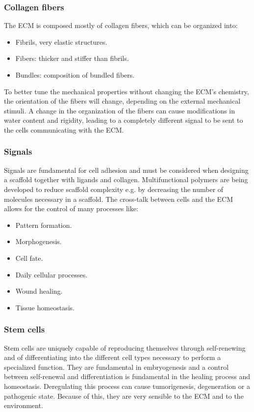 		\subsubsection{Collagen fibers}
		The ECM is composed mostly of collagen fibers, which can be organized into:

		\begin{multicols}{2}
			\begin{itemize}
				\item Fibrils, very elastic structures.
				\item Fibers: thicker and stiffer than fibrils.
				\item Bundles: composition of bundled fibers.
			\end{itemize}
		\end{multicols}

		To better tune the mechanical properties without changing the ECM's chemistry, the orientation of the fibers will change, depending on the external mechanical stimuli.
		A change in the organization of the fibers can cause modifications in water content and rigidity,  leading to a completely different signal to be sent to the cells communicating with the ECM.

		\subsubsection{Signals}
		Signals are fundamental for cell adhesion and must be considered when designing a scaffold together with ligands and collagen.
		Multifunctional polymers are being developed to reduce scaffold complexity e.g.  by decreasing the number of molecules necessary in a scaffold. 
		The cross-talk between cells and the ECM allows for the control of many processes like:

		\begin{multicols}{3}
			\begin{itemize}
				\item Pattern formation.
				\item Morphogenesis.
				\item Cell fate.
				\item Daily cellular processes.
				\item Wound healing.
				\item Tissue homeostasis.
			\end{itemize}
		\end{multicols}

		\subsubsection{Stem cells}
		Stem cells are uniquely capable of reproducing themselves through self-renewing and of differentiating into the different cell types necessary to perform a specialized function.
		They are fundamental in embryogenesis and a control between self-renewal and differentiation is fundamental in the healing process and homeostasis.
		Deregulating this process can cause tumorigenesis, degeneration or a pathogenic state.
		Because of this, they are very sensible to the ECM and to the environment.

